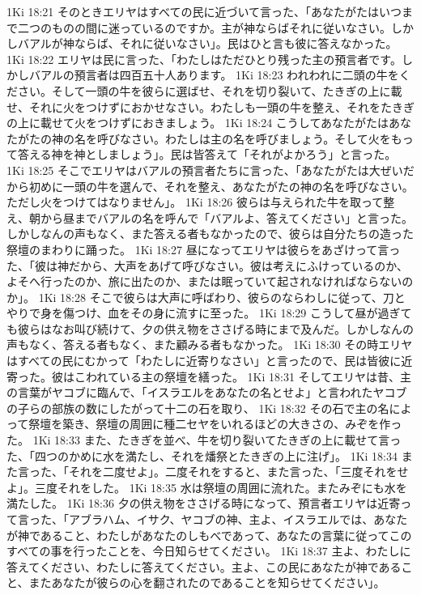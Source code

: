 1Ki 18:21  そのときエリヤはすべての民に近づいて言った、「あなたがたはいつまで二つのものの間に迷っているのですか。主が神ならばそれに従いなさい。しかしバアルが神ならば、それに従いなさい」。民はひと言も彼に答えなかった。
1Ki 18:22  エリヤは民に言った、「わたしはただひとり残った主の預言者です。しかしバアルの預言者は四百五十人あります。
1Ki 18:23  われわれに二頭の牛をください。そして一頭の牛を彼らに選ばせ、それを切り裂いて、たきぎの上に載せ、それに火をつけずにおかせなさい。わたしも一頭の牛を整え、それをたきぎの上に載せて火をつけずにおきましょう。
1Ki 18:24  こうしてあなたがたはあなたがたの神の名を呼びなさい。わたしは主の名を呼びましょう。そして火をもって答える神を神としましょう」。民は皆答えて「それがよかろう」と言った。
1Ki 18:25  そこでエリヤはバアルの預言者たちに言った、「あなたがたは大ぜいだから初めに一頭の牛を選んで、それを整え、あなたがたの神の名を呼びなさい。ただし火をつけてはなりません」。
1Ki 18:26  彼らは与えられた牛を取って整え、朝から昼までバアルの名を呼んで「バアルよ、答えてください」と言った。しかしなんの声もなく、また答える者もなかったので、彼らは自分たちの造った祭壇のまわりに踊った。
1Ki 18:27  昼になってエリヤは彼らをあざけって言った、「彼は神だから、大声をあげて呼びなさい。彼は考えにふけっているのか、よそへ行ったのか、旅に出たのか、または眠っていて起されなければならないのか」。
1Ki 18:28  そこで彼らは大声に呼ばわり、彼らのならわしに従って、刀とやりで身を傷つけ、血をその身に流すに至った。
1Ki 18:29  こうして昼が過ぎても彼らはなお叫び続けて、夕の供え物をささげる時にまで及んだ。しかしなんの声もなく、答える者もなく、また顧みる者もなかった。
1Ki 18:30  その時エリヤはすべての民にむかって「わたしに近寄りなさい」と言ったので、民は皆彼に近寄った。彼はこわれている主の祭壇を繕った。
1Ki 18:31  そしてエリヤは昔、主の言葉がヤコブに臨んで、「イスラエルをあなたの名とせよ」と言われたヤコブの子らの部族の数にしたがって十二の石を取り、
1Ki 18:32  その石で主の名によって祭壇を築き、祭壇の周囲に種二セヤをいれるほどの大きさの、みぞを作った。
1Ki 18:33  また、たきぎを並べ、牛を切り裂いてたきぎの上に載せて言った、「四つのかめに水を満たし、それを燔祭とたきぎの上に注げ」。
1Ki 18:34  また言った、「それを二度せよ」。二度それをすると、また言った、「三度それをせよ」。三度それをした。
1Ki 18:35  水は祭壇の周囲に流れた。またみぞにも水を満たした。
1Ki 18:36  夕の供え物をささげる時になって、預言者エリヤは近寄って言った、「アブラハム、イサク、ヤコブの神、主よ、イスラエルでは、あなたが神であること、わたしがあなたのしもべであって、あなたの言葉に従ってこのすべての事を行ったことを、今日知らせてください。
1Ki 18:37  主よ、わたしに答えてください、わたしに答えてください。主よ、この民にあなたが神であること、またあなたが彼らの心を翻されたのであることを知らせてください」。
